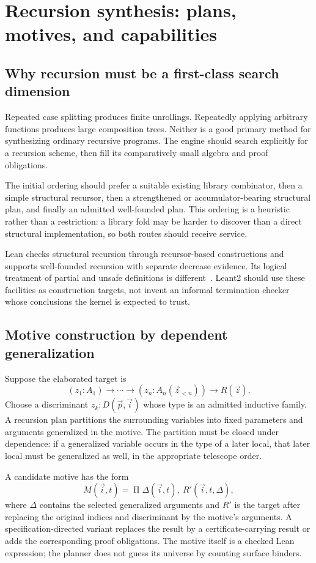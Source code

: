 \documentclass[11pt,letterpaper]{article}
\theoremstyle{definition}
\theoremstyle{remark}
\begin{document}
\section{Recursion synthesis: plans, motives, and capabilities}
\label{sec:recursion}

\subsection{Why recursion must be a first-class search dimension}

Repeated case splitting produces finite unrollings. Repeatedly applying arbitrary functions produces large composition trees. Neither is a good primary method for synthesizing ordinary recursive programs. The engine should search explicitly for a recursion scheme, then fill its comparatively small algebra and proof obligations.

The initial ordering should prefer a suitable existing library combinator, then a simple structural recursor, then a strengthened or accumulator-bearing structural plan, and finally an admitted well-founded plan. This ordering is a heuristic rather than a restriction: a library fold may be harder to discover than a direct structural implementation, so both routes should receive service.

Lean checks structural recursion through recursor-based constructions and supports well-founded recursion with separate decrease evidence. Its logical treatment of partial and unsafe definitions is different~\cite{recursion}. Leant2 should use these facilities as construction targets, not invent an informal termination checker whose conclusions the kernel is expected to trust.

\subsection{Motive construction by dependent generalization}

Suppose the elaborated target is
\[
 (z_1:A_1)\to\cdots\to(z_n:A_n(\vec z_{<n}))\to R(\vec z).
\]
Choose a discriminant $z_k:D(\vec p,\vec i)$ whose type is an admitted inductive family. A recursion plan partitions the surrounding variables into fixed parameters and arguments generalized in the motive. The partition must be closed under dependence: if a generalized variable occurs in the type of a later local, that later local must be generalized as well, in the appropriate telescope order.

A candidate motive has the form
\begin{equation}
 M(\vec i,t)=\mathop{\Pi}\Delta(\vec i,t),\ R'(\vec i,t,\Delta),
 \label{eq:motive}
\end{equation}
where $\Delta$ contains the selected generalized arguments and $R'$ is the target after replacing the original indices and discriminant by the motive's arguments. A specification-directed variant replaces the result by a certificate-carrying result or adds the corresponding proof obligations. The motive itself is a checked Lean expression; the planner does not guess its universe by counting surface binders.
\end{document}
